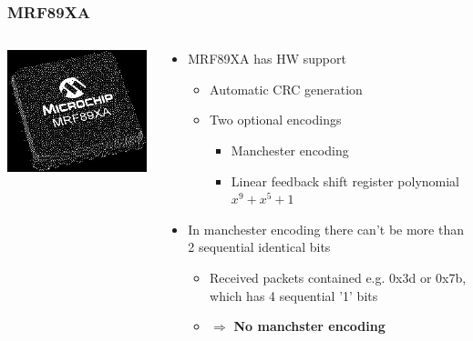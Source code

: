 \documentclass[aspectratio=169]{beamer}
\begin{document}
\begin{frame}
	\frametitle{MRF89XA}

	\begin{columns}
		\begin{column}{0.3\textwidth}
			\includegraphics[width=1.0\textwidth]{mrf89xa-dithered.png}
		\end{column}
		\begin{column}{0.7\textwidth}
			\begin{itemize}
				\item MRF89XA has HW support
					\begin{itemize}
						\item Automatic CRC generation
						\item Two optional encodings
						\begin{itemize}
							\item Manchester encoding
							\item Linear feedback shift register polynomial $x^9 + x^5 + 1$
						\end{itemize}
					\end{itemize}
				\item In manchester encoding there can't be more than 2 sequential identical bits
					\begin{itemize}
						\item Received packets contained e.g. 0x3d or 0x7b, which has 4 sequential '1' bits
						\item $\Rightarrow$ \textbf{No manchster encoding}
					\end{itemize}
			\end{itemize}
		\end{column}
	\end{columns}

\end{frame}
\end{document}
